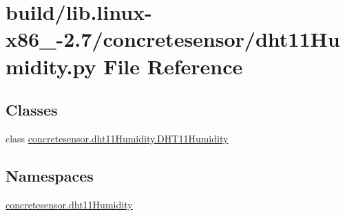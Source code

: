 \hypertarget{build_2lib_8linux-x86__64-2_87_2concretesensor_2dht11Humidity_8py}{}\section{build/lib.linux-\/x86\+\_-\/2.7/concretesensor/dht11\+Humidity.py File Reference}
\label{build_2lib_8linux-x86__64-2_87_2concretesensor_2dht11Humidity_8py}
\subsection*{Classes}
\begin{DoxyCompactItemize}
\item 
class \hyperlink{classconcretesensor_1_1dht11Humidity_1_1DHT11Humidity}{concretesensor.\+dht11\+Humidity.\+D\+H\+T11\+Humidity}
\end{DoxyCompactItemize}
\subsection*{Namespaces}
\begin{DoxyCompactItemize}
\item 
 \hyperlink{namespaceconcretesensor_1_1dht11Humidity}{concretesensor.\+dht11\+Humidity}
\end{DoxyCompactItemize}
